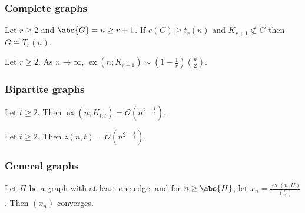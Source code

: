 \documentclass{article}
\DeclareMathOperator{\ext}{ex}
\begin{document}
\subsubsection{Complete graphs}





\begin{nthm}\label{thm:9}
    Let $r \geq 2$ and $\abs{G} = n \geq r+1$. If $e(G) \geq t_r(n)$ and $K_{r+1} \not\subset G$ then $G \cong T_r(n)$.
\end{nthm}








\begin{ncor}\label{cor:10}
    Let $r \geq 2$. As $n \to \infty$, $\ext(n; K_{r+1}) \sim (1 - \frac{1}{r}) \binom{n}{2}$.
\end{ncor}
\subsubsection{Bipartite graphs}











\begin{nthm}\label{thm:11}
    Let $t \geq 2$.
    Then $\ext(n; K_{t,t}) = \mathcal{O}(n^{2 - \frac{1}{t}})$.
\end{nthm}








\begin{nthm}\label{thm:12}
    Let $t \geq 2$. Then $z(n, t)  = \mathcal{O}(n^{2 - \frac{1}{t}})$.
\end{nthm}

\subsubsection{General graphs}





\begin{nprop}\label{prop:13}
    Let $H$ be a graph with at least one edge, and for $n \geq \abs{H}$, let $x_n = \frac{\ext(n; H)}{\binom{n}{2}}$. Then $(x_n)$ converges.
\end{nprop}
\end{document}
